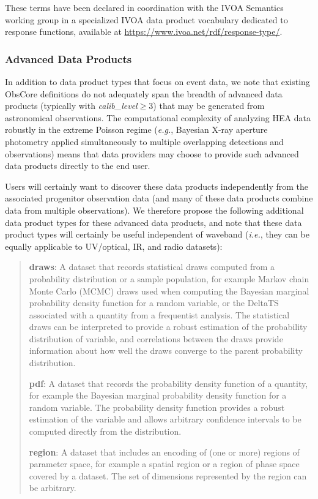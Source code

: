 \documentclass[11pt,a4paper]{ivoa}
\begin{document}
These terms have been declared in coordination with the IVOA Semantics working group in a specialized IVOA data product vocabulary dedicated to response functions, available at \url{https://www.ivoa.net/rdf/response-type/}.

\subsubsection{Advanced Data Products}

In addition to data product types that focus on event data, we note that existing ObsCore definitions do not adequately span the breadth of advanced data products (typically with {\em calib\_level\/}${}\ge 3$) that may be generated from astronomical observations. The computational complexity of analyzing \gls{HEA} data robustly in the extreme Poisson regime ({\em e.g.\/}, Bayesian X-ray aperture photometry applied simultaneously to multiple overlapping detections and observations) means that data providers may choose to provide such advanced data products directly to the end user.

Users will certainly want to discover these data products independently from the associated progenitor observation data (and many of these data products combine data from multiple observations). We therefore propose the following additional data product types for these advanced data products, and note that these data product types will certainly be useful independent of waveband ({\em i.e.\/}, they can be equally applicable to UV/optical, IR, and radio datasets):

\begin{quote}
  {\bf draws}:  A dataset that records statistical draws computed from a probability distribution or a sample population, for example Markov chain Monte Carlo (MCMC) draws used when computing the Bayesian marginal probability density function for a random variable, or the DeltaTS associated with a quantity from a frequentist analysis.  The statistical draws can be interpreted to provide a robust estimation of the probability distribution of variable, and correlations between the draws provide information about how well the draws converge to the parent probability distribution.

{\bf pdf}: A dataset that records the probability density function of a quantity, for example the Bayesian marginal probability density function for a random variable.  The probability density function provides a robust estimation of the variable and allows arbitrary confidence intervals to be computed directly from the distribution.

{\bf region}: A dataset that includes an encoding of (one or more) regions of parameter space, for example a spatial region or a region of phase space covered by a dataset.  The set of dimensions represented by the region can be arbitrary.
\end{quote}
\end{document}
